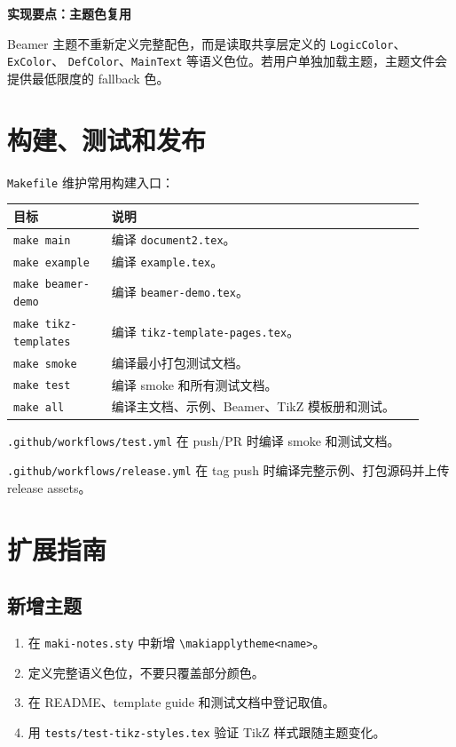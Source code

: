 \documentclass[a4paper,11pt]{ltxdoc}
\newcommand{\mfile}[1]{\texttt{#1}}
\newcommand{\mcmd}[1]{\texttt{\textbackslash#1}}
\newcommand{\mkey}[1]{\texttt{#1}}
\newenvironment{implementation}[1]
  {\par\medskip\noindent\textbf{\color{MakiBlue}实现要点：#1}\par\smallskip}
  {\par\medskip}
\begin{document}
\begin{implementation}{主题色复用}
Beamer 主题不重新定义完整配色，而是读取共享层定义的 \mkey{LogicColor}、\mkey{ExColor}、
\mkey{DefColor}、\mkey{MainText} 等语义色位。若用户单独加载主题，主题文件会提供最低限度的 fallback 色。
\end{implementation}

\section{构建、测试和发布}

\mfile{Makefile} 维护常用构建入口：

\begin{longtable}{@{}p{0.22\linewidth}p{0.7\linewidth}@{}}
\toprule
目标 & 说明 \\
\midrule
\mkey{make main} & 编译 \mfile{document2.tex}。\\
\mkey{make example} & 编译 \mfile{example.tex}。\\
\mkey{make beamer-demo} & 编译 \mfile{beamer-demo.tex}。\\
\mkey{make tikz-templates} & 编译 \mfile{tikz-template-pages.tex}。\\
\mkey{make smoke} & 编译最小打包测试文档。\\
\mkey{make test} & 编译 smoke 和所有测试文档。\\
\mkey{make all} & 编译主文档、示例、Beamer、TikZ 模板册和测试。\\
\bottomrule
\end{longtable}

\noindent\mfile{.github/workflows/test.yml}
在 push/PR 时编译 smoke 和测试文档。

\noindent\mfile{.github/workflows/release.yml}
在 tag push 时编译完整示例、打包源码并上传 release assets。

\section{扩展指南}

\subsection{新增主题}

\begin{enumerate}
\item 在 \mfile{maki-notes.sty} 中新增 \mcmd{makiapplytheme<name>}。
\item 定义完整语义色位，不要只覆盖部分颜色。
\item 在 README、template guide 和测试文档中登记取值。
\item 用 \mfile{tests/test-tikz-styles.tex} 验证 TikZ 样式跟随主题变化。
\end{enumerate}
\end{document}
